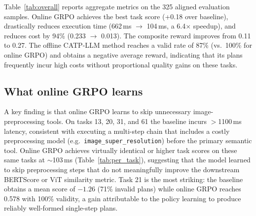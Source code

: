 \documentclass[10pt,twocolumn]{article}
\begin{document}
Table~\ref{tab:overall} reports aggregate metrics on the 325 aligned
evaluation samples.
Online GRPO achieves the best task score (+0.18 over baseline), drastically
reduces execution time (662\,ms $\rightarrow$ 104\,ms, a 6.4$\times$
speedup), and reduces cost by 94\% (0.233 $\rightarrow$ 0.013).
The composite reward improves from 0.11 to 0.27.
The offline CATP-LLM method reaches a valid rate of 87\% (vs.\ 100\% for
online GRPO) and obtains a negative average reward, indicating that its
plans frequently incur high costs without proportional quality gains on
these tasks.

\begin{table}[h]
\centering
\caption{Aligned evaluation on 325 samples across 8 OpenCATP tasks.
Best value per column in \textbf{bold}.
$\downarrow$ = lower is better; $\uparrow$ = higher is better.}
\label{tab:overall}
\end{table}

\subsection{What online GRPO learns}

A key finding is that online GRPO learns to skip unnecessary image-preprocessing
tools.
On tasks 13, 20, 31, and 61 the baseline incurs $>$1100\,ms latency,
consistent with executing a multi-step chain that includes a costly
preprocessing model (e.g.\ \texttt{image\_super\_resolution}) before the
primary semantic tool.
Online GRPO achieves virtually identical or higher task scores on these same
tasks at $\sim$103\,ms (Table~\ref{tab:per_task}), suggesting that the model
learned to skip preprocessing steps that do not meaningfully improve the
downstream BERTScore or ViT similarity metric.
Task 21 is the most striking: the baseline obtains a mean score of $-1.26$
(71\% invalid plans) while online GRPO reaches 0.578 with 100\% validity,
a gain attributable to the policy learning to produce reliably well-formed
single-step plans.
\end{document}
